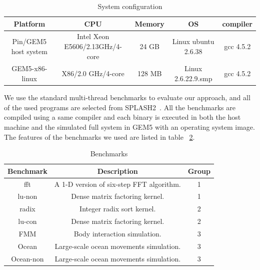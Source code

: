 \documentclass[10pt,journal,cspaper,compsoc]{IEEEtran}
\begin{document}
\begin{table}
\caption{System configuration} \label{tab:sysconfig} \centering
\begin{tabular}{|c|c|c|c|c|}
\hline Platform & CPU & Memory & OS & compiler \\
\hline Pin/GEM5 host system & Intel Xeon E5606/2.13GHz/4-core& 24 GB & Linux ubuntu 2.6.38 & gcc 4.5.2 \\
\hline GEM5-x86-linux & X86/2.0 GHz/4-core & 128 MB &  Linux 2.6.22.9.smp & gcc 4.5.2 \\
\hline
\end{tabular}
\end{table}

We use the standard multi-thread benchmarks to evaluate our
approach, and all of the used programs are selected from
SPLASH2~\cite{splash295}. All the benchmarks are compiled using a
same compiler and each binary is executed in both the host machine
and the simulated full system in GEM5 with an operating system
image. The features of the benchmarks we used are listed in table
~\ref{tab:benchmark}.

\begin{table}
\caption{Benchmarks} \label{tab:benchmark} \centering
\begin{tabular}{|c|c|c|}
\hline Benchmark & Description & Group\\
\hline fft & A 1-D version of six-step FFT algorithm. & 1 \\
\hline lu-non & Dense matrix factoring kernel. & 1\\
\hline radix & Integer radix sort kernel. & 2 \\
\hline lu-con & Dense matrix factoring kernel. &  2\\
\hline FMM & Body interaction simulation. & 3\\
\hline Ocean & Large-scale ocean movements simulation. & 3\\
\hline Ocean-non & Large-scale ocean movements simulation. & 3\\
\hline
\end{tabular}
\end{table}
\end{document}
